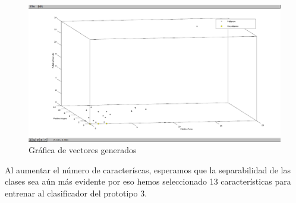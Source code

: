 \begin{center}
\begin{figure}[h]
	\includegraphics[scale=.3]{images/vectores}
	\caption{Gr\'afica de vectores generados}
	\label{fig:graficaVectores}
\end{figure}
\end{center}

Al aumentar el n\'umero de caracter\'iscas, esperamos que la separabilidad de las clases sea a\'un m\'as evidente por eso hemos seleccionado 13 caracter\'isticas para entrenar al clasificador del prototipo 3.
